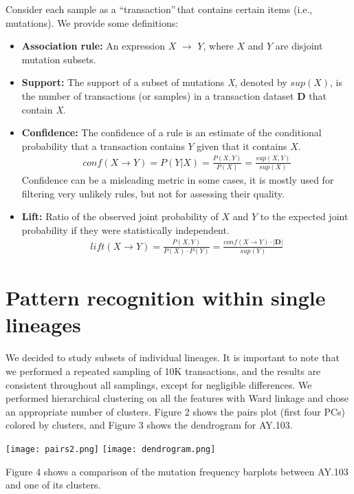 \documentclass[a0,landscape]{a0poster}
\begin{document}
\begin{multicols}{4}
		Consider each sample as a \textquotedblleft transaction\textquotedblright$\,$that contains certain items (i.e., mutations). We provide some definitions:
		\begin{itemize}
			\item \textbf{Association rule:} An expression $X$ $\rightarrow$ $Y$, where $X$ and $Y$ are disjoint mutation subsets\cite{arules}. 
			\item \textbf{Support:} The support of a subset of mutations \textit{X}, denoted by $sup(X)$, is the number of transactions (or samples) in a transaction dataset \textbf{D} that contain \textit{X}. 
			\item \textbf{Confidence:} The confidence of a rule is an estimate of the conditional probability that a transaction contains $Y$ given that it contains $X$.
			\begin{align*}
				conf(X \rightarrow Y) = P(Y|X) = \frac{P(X,Y)}{P(X)} = \frac{sup(X,Y)}{sup(X)}
			\end{align*}
			Confidence can be a misleading metric in some cases, it is mostly used for filtering very unlikely rules, but not for assessing their quality.
			\item \textbf{Lift:} Ratio of the observed joint probability of $X$ and $Y$ to the expected joint probability if they were statistically independent.
			\begin{align*}
				lift(X \rightarrow Y) = \frac{P(X,Y)}{P(X)\cdot P(Y)} = \frac{conf(X\rightarrow Y)\cdot |\mathbf{D}|}{sup(Y)}
			\end{align*}
		\end{itemize}
		
		\section*{Pattern recognition within single lineages}
		We decided to study subsets of individual lineages. It is important to note that we performed a repeated sampling of 10K transactions, and the results are consistent throughout all samplings, except for negligible differences. We performed hierarchical clustering on all the features with Ward linkage and chose an appropriate number of clusters. Figure 2 shows the pairs plot (first four PCs) colored by clusters, and Figure 3 shows the dendrogram for AY.103. 
		\begin{center}\vspace{1cm}
			\texttt{[image: pairs2.png]}
			\texttt{[image: dendrogram.png]}
		\end{center}\vspace{1cm}
		Figure 4 shows a comparison of the mutation frequency barplots between AY.103 and one of its clusters. 


\end{multicols}
\end{document}
